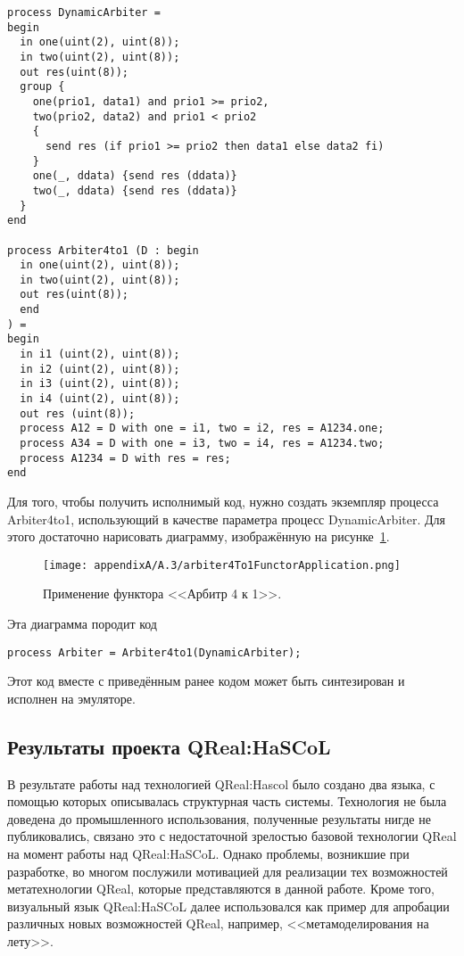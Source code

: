 \vspace{5mm}
\begin{minipage}{\linewidth}
\begin{verbatim}
process DynamicArbiter =
begin
  in one(uint(2), uint(8));
  in two(uint(2), uint(8));
  out res(uint(8));
  group {
    one(prio1, data1) and prio1 >= prio2,
    two(prio2, data2) and prio1 < prio2
    {
      send res (if prio1 >= prio2 then data1 else data2 fi)
    }
    one(_, ddata) {send res (ddata)}
    two(_, ddata) {send res (ddata)}
  }
end

process Arbiter4to1 (D : begin
  in one(uint(2), uint(8));
  in two(uint(2), uint(8));
  out res(uint(8));
  end
) =
begin
  in i1 (uint(2), uint(8));
  in i2 (uint(2), uint(8));
  in i3 (uint(2), uint(8));
  in i4 (uint(2), uint(8));
  out res (uint(8));
  process A12 = D with one = i1, two = i2, res = A1234.one;
  process A34 = D with one = i3, two = i4, res = A1234.two;
  process A1234 = D with res = res;
end
\end{verbatim}
\end{minipage}
\vspace{5mm}

Для того, чтобы получить исполнимый код, нужно создать экземпляр процесса Arbiter4to1, 
использующий в качестве параметра процесс DynamicArbiter. Для этого достаточно нарисовать 
диаграмму, изображённую на рисунке~\ref{image:arbiter4To1FunctorApplication}.

\begin{figure} [ht]
	\begin{center}
		\texttt{[image: appendixA/A.3/arbiter4To1FunctorApplication.png]}
		\caption{Применение функтора <<Арбитр 4 к 1>>.}
		\label{image:arbiter4To1FunctorApplication}
	\end{center}
\end{figure}

Эта диаграмма породит код 

\begin{verbatim}
process Arbiter = Arbiter4to1(DynamicArbiter);
\end{verbatim}

Этот код вместе с приведённым ранее кодом может быть синтезирован и исполнен на эмуляторе.

\subsection{Результаты проекта QReal:HaSCoL}
В результате работы над технологией QReal:Hascol было создано два языка, с помощью 
которых описывалась структурная часть системы. Технология не была доведена до промышленного 
использования, полученные результаты нигде не публиковались, связано это с недостаточной 
зрелостью базовой технологии QReal на момент работы над QReal:HaSCoL. Однако проблемы, 
возникшие при разработке, во многом послужили мотивацией для реализации тех возможностей 
метатехнологии QReal, которые представляются в данной работе. Кроме того, визуальный язык 
QReal:HaSCoL далее использовался как пример для апробации различных новых возможностей 
QReal, например, <<метамоделирования на лету>>.

